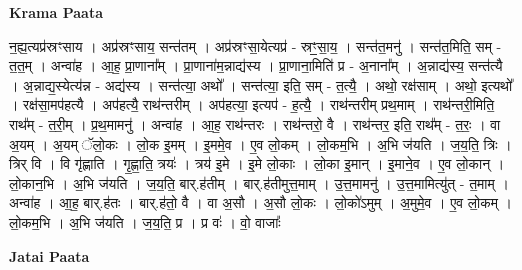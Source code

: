 \documentclass[17pt]{extarticle}
\begin{document}
\textbf{Krama Paata} \newline

न॒ह्य॒त्यप्र॑स्रꣳसाय । अप्र॑स्रꣳसाय॒ सन्त॑तम् । अप्र॑स्रꣳसा॒येत्यप्र॑ - स्रꣳ॒॒सा॒य॒ । सन्त॑त॒मनु॑ । सन्त॑त॒मिति॒ सम् - त॒त॒म् । अन्वा॑ह । आ॒ह॒ प्रा॒णाना᳚म् । प्रा॒णाना॑म॒न्नाद्य॑स्य । प्रा॒णाना॒मिति॑ प्र - अ॒नाना᳚म् । अ॒न्नाद्य॑स्य॒ सन्त॑त्यै । अ॒न्नाद्य॒स्येत्य॑न्न - अद्य॑स्य । सन्त॑त्या॒ अथो᳚ । सन्त॑त्या॒ इति॒ सम् - त॒त्यै॒ । अथो॒ रक्ष॑साम् । अथो॒ इत्यथो᳚ । रक्ष॑सा॒मप॑हत्यै । अप॑हत्यै॒ राथ॑न्तरीम् । अप॑हत्या॒ इत्यप॑ - ह॒त्यै॒ । राथ॑न्तरीम् प्रथ॒माम् । राथ॑न्तरी॒मिति॒ राथ᳚म् - त॒री॒म् । प्र॒थ॒मामनु॑ । अन्वा॑ह । आ॒ह॒ राथ॑न्तरः । राथ॑न्तरो॒ वै । राथ॑न्तर॒ इति॒ राथ᳚म् - त॒रः॒ । वा अ॒यम् । अ॒यम् ॅलो॒कः । लो॒क इ॒मम् । इ॒ममे॒व । ए॒व लो॒कम् । लो॒कम॒भि । अ॒भि ज॑यति । ज॒य॒ति॒ त्रिः । त्रिर् वि । वि गृ॑ह्णाति । गृ॒ह्णा॒ति॒ त्रयः॑ । त्रय॑ इ॒मे । इ॒मे लो॒काः । लो॒का इ॒मान् । इ॒माने॒व । ए॒व लो॒कान् । लो॒कान॒भि । अ॒भि ज॑यति । ज॒य॒ति॒ बार्.ह॑तीम् । बार्.ह॑तीमुत्त॒माम् । उ॒त्त॒मामनु॑ । उ॒त्त॒मामित्यु॑त् - त॒माम् । अन्वा॑ह । आ॒ह॒ बार्.ह॑तः । बार्.ह॑तो॒ वै । वा अ॒सौ । अ॒सौ लो॒कः । लो॒को॑ऽमुम् । अ॒मुमे॒व । ए॒व लो॒कम् । लो॒कम॒भि । अ॒भि ज॑यति । ज॒य॒ति॒ प्र । प्र वः॑ । वो॒ वाजाः᳚ \newline

\textbf{Jatai Paata} \newline
\end{document}
